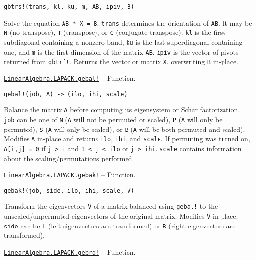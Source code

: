 \begin{adjustwidth}{2em}{0pt}


\begin{verbatim}
gbtrs!(trans, kl, ku, m, AB, ipiv, B)
\end{verbatim}

Solve the equation \texttt{AB * X = B}. \texttt{trans} determines the orientation of \texttt{AB}. It may be \texttt{N} (no transpose), \texttt{T} (transpose), or \texttt{C} (conjugate transpose). \texttt{kl} is the first subdiagonal containing a nonzero band, \texttt{ku} is the last superdiagonal containing one, and \texttt{m} is the first dimension of the matrix \texttt{AB}. \texttt{ipiv} is the vector of pivots returned from \texttt{gbtrf!}. Returns the vector or matrix \texttt{X}, overwriting \texttt{B} in-place.



\end{adjustwidth}
\hypertarget{16195720455630892558}{}
\hyperlink{16195720455630892558}{\texttt{LinearAlgebra.LAPACK.gebal!}}  -- {Function.}

\begin{adjustwidth}{2em}{0pt}


\begin{verbatim}
gebal!(job, A) -> (ilo, ihi, scale)
\end{verbatim}

Balance the matrix \texttt{A} before computing its eigensystem or Schur factorization. \texttt{job} can be one of \texttt{N} (\texttt{A} will not be permuted or scaled), \texttt{P} (\texttt{A} will only be permuted), \texttt{S} (\texttt{A} will only be scaled), or \texttt{B} (\texttt{A} will be both permuted and scaled). Modifies \texttt{A} in-place and returns \texttt{ilo}, \texttt{ihi}, and \texttt{scale}. If permuting was turned on, \texttt{A[i,j] = 0} if \texttt{j > i} and \texttt{1 < j < ilo} or \texttt{j > ihi}. \texttt{scale} contains information about the scaling/permutations performed.



\end{adjustwidth}
\hypertarget{6051699672892129595}{}
\hyperlink{6051699672892129595}{\texttt{LinearAlgebra.LAPACK.gebak!}}  -- {Function.}

\begin{adjustwidth}{2em}{0pt}


\begin{verbatim}
gebak!(job, side, ilo, ihi, scale, V)
\end{verbatim}

Transform the eigenvectors \texttt{V} of a matrix balanced using \texttt{gebal!} to the unscaled/unpermuted eigenvectors of the original matrix. Modifies \texttt{V} in-place. \texttt{side} can be \texttt{L} (left eigenvectors are transformed) or \texttt{R} (right eigenvectors are transformed).



\end{adjustwidth}
\hypertarget{12871648146516835346}{}
\hyperlink{12871648146516835346}{\texttt{LinearAlgebra.LAPACK.gebrd!}}  -- {Function.}

